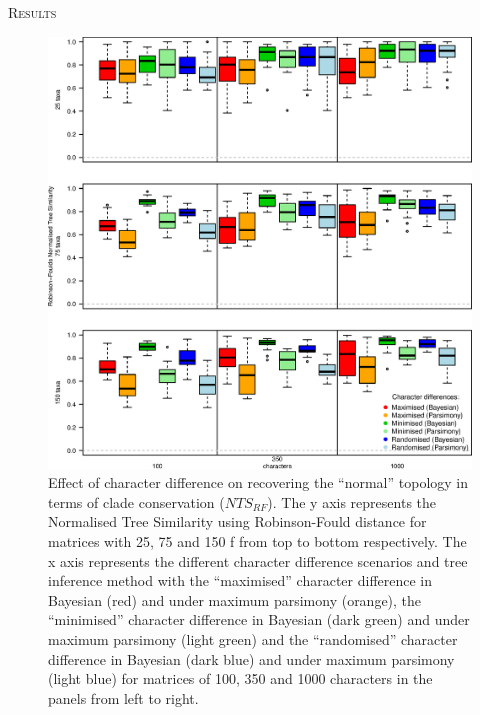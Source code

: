 \documentclass[12pt,letterpaper]{article}
\renewcommand{\section}[1]{%
\bigskip
\begin{center}
\begin{Large}
\normalfont\scshape #1
\medskip
\end{Large}
\end{center}}
\begin{document}
\section{Results}

\begin{figure}[!htbp]
\centering
   \includegraphics[width=1\textwidth]{RF_results_best.eps}
\caption{\small{Effect of character difference on recovering the ``normal'' topology in terms of clade conservation ($NTS_{RF}$). The y axis represents the Normalised Tree Similarity using Robinson-Fould distance for matrices with 25, 75 and 150 f from top to bottom respectively. The x axis represents the different character difference scenarios and tree inference method with the ``maximised'' character difference in Bayesian (red) and under maximum parsimony (orange), the ``minimised'' character difference in Bayesian (dark green) and under maximum parsimony (light green) and the ``randomised'' character difference in Bayesian (dark blue) and under maximum parsimony (light blue) for matrices of 100, 350 and 1000 characters in the panels from left to right.}}
\label{Fig:RF_results_best}
\end{figure}
\end{document}
